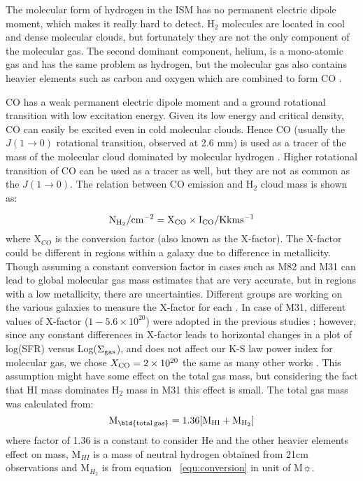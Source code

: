 \documentclass[useAMS,usenatbib]{mn2e}
\begin{document}
 The molecular form of hydrogen in the ISM has no permanent electric dipole moment, which makes it really hard to detect. H$_2$ molecules are located in cool and dense molecular clouds, but fortunately they are not the only component of the molecular gas. The second dominant component, helium, is a mono-atomic gas and has the same problem as hydrogen, but the molecular gas also contains heavier elements such as carbon and oxygen which are combined to form CO \citep{Bolato13}.

CO has a weak permanent electric dipole moment and a ground rotational transition with low excitation energy. Given its low energy and critical density, CO can easily be excited even in cold molecular clouds. Hence CO (usually the $J(1\rightarrow 0)$ rotational transition, observed at 2.6 mm) is used as a tracer of the mass of the molecular cloud dominated by molecular hydrogen \citep[see, for example,][] {Sanders84}. Higher rotational transition of CO can be used as a tracer as well, but they are not as common as the $J(1\rightarrow 0)$. The relation between CO emission and H$_2$ cloud mass is shown as:

\begin{equation}
\label{equ:conversion}
\rm N_{H_2}/\rm cm^{-2} = X_{CO} \times I_{CO}/\rm K km s^{-1}
\end{equation}
where X$_{CO}$ is the conversion factor (also known as the X-factor). The X-factor could be different in regions within a galaxy due to difference in metallicity. Though assuming a constant conversion factor in cases such as M82 and M31 can lead to global molecular gas mass estimates that are very accurate,  but in regions with a low metallicity, there are uncertainties. Different groups are working on the various galaxies to measure the X-factor for each \citep{Wilson95, Bosselli02, Bolato13}. In case of M31, different values of X-factor ($1-5.6 \times 10^{20}$) were adopted in the previous studies \citep[e.g.][]{Ford13, Bolato13, Leroy11, Bolato08, Nieten06}; however, since any constant differences in X-factor leads to horizontal changes in a plot of log(SFR) versus Log($\Sigma_{\rm {gas}}$), and does not affect our K-S law power index for molecular gas,  we chose $X_{\rm {CO}}= 2 \times 10^{20}$  the same as many other works \citep[e.g.][]{Ford13, Smith12}. This assumption might have some effect on the total gas mass, but considering the fact that HI mass dominates H$_2$ mass in M31 this effect is small.
The total gas mass was calculated from:
\begin{equation}
\label{equ:total_gas}
\rm M_{\rm \bld {total \, gas}} = 1.36[M_{HI}+M_{H_2}]
\end{equation}
where  factor of 1.36 is a constant to consider He and the other heavier elements effect on mass, M$_{HI}$ is a mass of neutral hydrogen obtained from 21cm observations and M$_{H_2}$ is from equation ~\ref{equ:conversion} in unit of M$\sun$.
\end{document}
